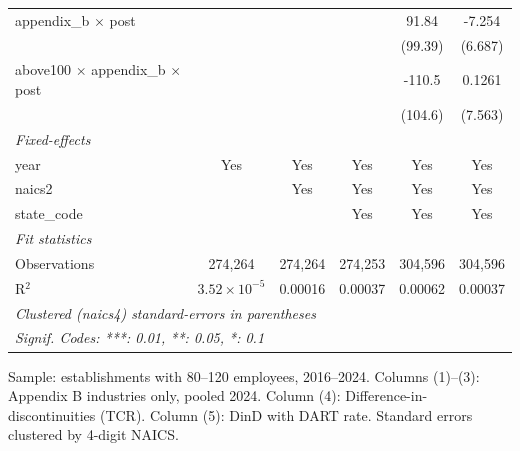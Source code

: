 \begin{table}[htbp]
{\begin{tabular}{lccccc}
      appendix\_b $\times$ post                      &                       &          &          & 91.84    & -7.254\\   
                                                     &                       &          &          & (99.39)  & (6.687)\\   
      above100 $\times$ appendix\_b $\times$ post    &                       &          &          & -110.5   & 0.1261\\   
                                                     &                       &          &          & (104.6)  & (7.563)\\   
      \midrule
      \emph{Fixed-effects}\\
      year                                           & Yes                   & Yes      & Yes      & Yes      & Yes\\  
      naics2                                         &                       & Yes      & Yes      & Yes      & Yes\\  
      state\_code                                    &                       &          & Yes      & Yes      & Yes\\  
      \midrule
      \emph{Fit statistics}\\
      Observations                                   & 274,264               & 274,264  & 274,253  & 304,596  & 304,596\\  
      R$^2$                                          & $3.52\times 10^{-5}$  & 0.00016  & 0.00037  & 0.00062  & 0.00037\\  
      \midrule \midrule
      \multicolumn{6}{l}{\emph{Clustered (naics4) standard-errors in parentheses}}\\
      \multicolumn{6}{l}{\emph{Signif. Codes: ***: 0.01, **: 0.05, *: 0.1}}\\
   \end{tabular}
   }

   \par \raggedright 
   Sample: establishments with 80--120 employees, 2016--2024. Columns (1)--(3): Appendix B industries only, pooled 2024. Column (4): Difference-in-discontinuities (TCR). Column (5): DinD with DART rate. Standard errors clustered by 4-digit NAICS.
\end{table}


